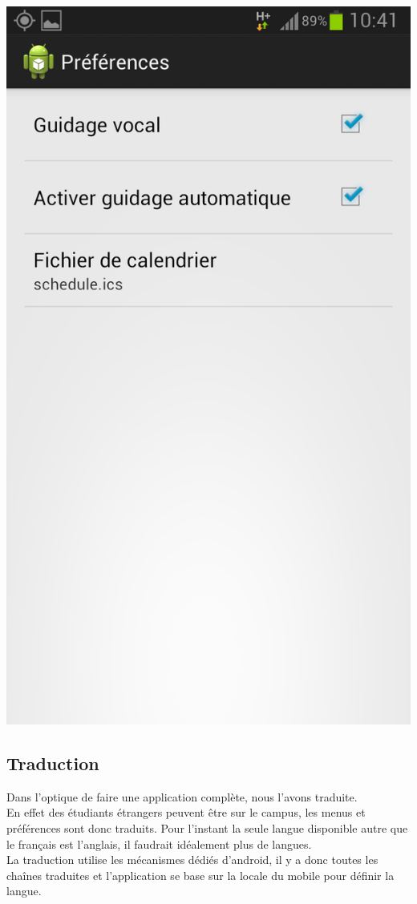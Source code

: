 \documentclass{article}
\begin{document}
	\begin{center}
		\includegraphics[scale=0.25]{reglages.png}
	\end{center}
	
	\subsection{Traduction}
	Dans l'optique de faire une application complète, nous l'avons traduite. \\
	En effet des étudiants étrangers peuvent être sur le campus, les menus et préférences sont donc traduits. Pour l'instant la seule langue disponible autre que le français est l'anglais, il faudrait idéalement plus de langues. \\
	La traduction utilise les mécanismes dédiés d'android, il y a donc toutes les chaînes traduites et l'application se base sur la locale du mobile pour définir la langue. \\
	
\end{document}
